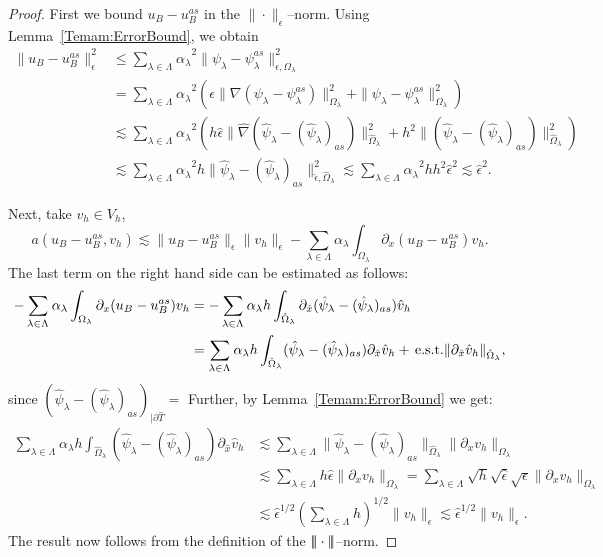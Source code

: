 \documentclass{article}
\newcommand{\vvvert}{\ensuremath|\!|\!|\xspace}
\newcommand{\est}{\text{\,e.s.t.}\xspace}
\newcommand{\psilambda}{\ensuremath{\psi_{\lambda}}}
\newcommand{\psilambdaas}{\ensuremath{\psi_{\lambda}^{as}}}
\newcommand{\summLA}[1][{}]{\ensuremath{\sum_{\lambda\in\Lambda_{#1}}\alpha_\lambda}}
\newcommand{\summL}[1][{}]{\ensuremath{\sum_{\lambda\in\Lambda_{#1}}}}
\begin{document}
\begin{proof}
First we bound $u_B - u_B^{as}$ in the $\|\cdot \|_\epsilon$--norm. Using Lemma~\ref{Temam:ErrorBound}, we obtain
$$
\begin{aligned}
\|u_B - u_B^{as} \|_\epsilon^2 & 
\le
\summLA^2 \|\psilambda - \psilambdaas \|_{\epsilon,\Omega_\lambda}^2 \\
& =
\summLA^2(\epsilon \|\nabla(\psilambda - \psilambdaas) \|_{\Omega_\lambda}^2 + \| \psilambda - \psilambdaas \|_{\Omega_\lambda}^2)\\
&\lesssim
\summLA^2(h\hat{\epsilon} \|\hat{\nabla}(\hat{\psi}_\lambda - (\hat{\psi}_\lambda)_{as}) \|_{\hat{\Omega}_\lambda}^2 + h^2\| (\hat{\psi}_\lambda - (\hat{\psi}_\lambda)_{as}) \|_{\hat{\Omega}_\lambda}^2)\\
&\lesssim
\summLA^2h\| \hat{\psi}_\lambda - (\hat{\psi}_\lambda)_{as}\|_{\hat{\epsilon},\hat{\Omega}_\lambda}^2 \lesssim
\summLA^2h h^2 \hat{\epsilon}^2
\lesssim
\hat{\epsilon}^2.
\end{aligned}
$$


Next, take $ v_h\in V_h$,
$$
 a(u_B - u_B^{as},v_h)  \lesssim \|u_B - u_B^{as} \|_\epsilon \|v_h\|_\epsilon
   - \summLA \int_{\Omega_\lambda} \partial_x (u_B - u_B^{as}) v_h.
$$
The last term on the right hand side can be estimated as follows:
$$
\begin{aligned}
    - \summLA \int_{\Omega_\lambda} \partial_x (u_B - u_B^{as}) v_h & = 
          - \summLA h \int_{\hat{\Omega}_\lambda} \partial_{\hat{x}} (\hat{\psi}_\lambda - (\hat{\psi}_\lambda)_{as}) \hat{v}_h \\
           & = \summL \alpha_\lambda h \int_{\hat{\Omega}_\lambda}  (\hat{\psi}_\lambda - (\hat{\psi}_\lambda)_{as}) \partial_{\hat{x}} \hat{v}_h 
            + \text{\est } \|\partial_{\hat{x}}\hat{v}_h\|_{\hat{\Omega}_\lambda},
\end{aligned}
$$
since $(\hat{\psi}_\lambda - (\hat{\psi}_\lambda)_{as})_{|\partial\hat{T}}=$ \est Further, by Lemma~\ref{Temam:ErrorBound} we get:
$$
\begin{aligned}
            \summL \alpha_\lambda h\int_{\hat{\Omega}_\lambda}  (\hat{\psi}_\lambda - (\hat{\psi}_\lambda)_{as}) \partial_{\hat{x}} \hat{v}_h 
                &\lesssim
                \summL  \|\hat{\psi}_\lambda - (\hat{\psi}_\lambda)_{as}\|_{\hat{\Omega}_\lambda}
                   \|\partial_x v_h\|_{\Omega_\lambda} \\
           & \lesssim 
           \summL  h\hat{\epsilon}  \|\partial_x v_h\|_{\Omega_\lambda}
            = \summL \sqrt{h} \sqrt{\hat{\epsilon}} \sqrt{\epsilon} \|\partial_x v_h\|_{\Omega_\lambda} \\
           & \lesssim \hat{\epsilon}^{1/2} (\summL h)^{1/2} \| v_h\|_\epsilon \lesssim 
            \hat{\epsilon}^{1/2} \| v_h\|_\epsilon. 
\end{aligned}
$$
The result now follows from the definition of the $\vvvert \cdot \vvvert $--norm.
\end{proof}
\end{document}
